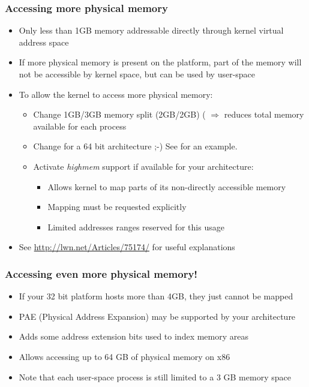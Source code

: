 \begin{frame}
  \frametitle{Accessing more physical memory}
  \begin{itemize}
  \item Only less than 1GB memory addressable directly through kernel
    virtual address space
  \item If more physical memory is present on the platform, part of
    the memory will not be accessible by kernel space, but can be used
    by user-space
  \item To allow the kernel to access more physical memory:
    \begin{itemize}
    \item Change 1GB/3GB memory split (2GB/2GB)
      ( $\Rightarrow$ reduces total memory
      available for each process
    \item Change for a 64 bit architecture ;-) See
       for an example.
    \item Activate \emph{highmem} support if available for your
      architecture:
      \begin{itemize}
      \item Allows kernel to map parts of its non-directly accessible
        memory
      \item Mapping must be requested explicitly
      \item Limited addresses ranges reserved for this usage
      \end{itemize}
    \end{itemize}
  \item See \url{http://lwn.net/Articles/75174/} for useful
    explanations
  \end{itemize}
\end{frame}

\begin{frame}
  \frametitle{Accessing even more physical memory!}
  \begin{itemize}
  \item If your 32 bit platform hosts more than 4GB, they just cannot
    be mapped
  \item PAE (Physical Address Expansion) may be supported by your
    architecture
  \item Adds some address extension bits used to index memory areas
  \item Allows accessing up to 64 GB of physical memory on x86
  \item Note that each user-space process is still limited to a 3 GB
    memory space
  \end{itemize}
\end{frame}

